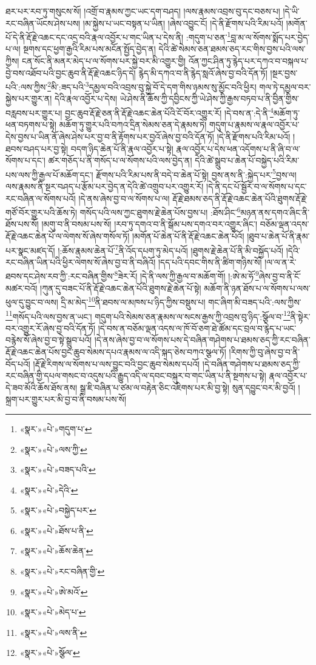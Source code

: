 ཐར་པར་རབ་ཏུ་གསུངས་སོ། །འགྲོ་བ་རྣམས་ཀྱང་ཡང་དག་བཤད། །ལས་རྣམས་འབྲས་བུ་དང་བཅས་པ། །དེ་ཡི་རང་བཞིན་ཡོངས་ཤེས་པས། །མ་སྐྱེས་པ་ཡང་བསྟན་པ་ཡིན། །ཞེས་འབྱུང་ངོ། །དེ་ནི་རྫོགས་པའི་རིམ་པའོ། །མགོན་པོ་དེ་ནི་རྡོ་རྗེ་འཆང་དང་འདྲ་བའི་རྣལ་འབྱོར་པ་གང་ཡིན་པ་དེས་ནི། :གདུག་པ་ཅན་\footnote{«སྣར་»«པེ་»གདུག་པ་}བླ་མ་ལ་སོགས་སྨོད་པར་བྱེད་པ་ལ། སྔགས་དང་ཕྱག་རྒྱའི་རིམ་པས་མངོན་སྤྱོད་བྱེད་ན། དེའི་ཚེ་སེམས་ཅན་ཐམས་ཅད་རང་གིས་བྱས་པའི་ལས་ཀྱིས། ངན་སོང་ནི་མནར་མེད་པ་ལ་སོགས་པར་སྐྱེ་བར་མི་འགྱུར་གྱི། འོན་ཀྱང་ཤིན་ཏུ་རྙེད་པར་དཀའ་བ་བསྐལ་པ་བྱེ་བས་འཐོབ་པའི་བྱང་ཆུབ་ནི་རྡོ་རྗེ་འཆང་ཉིད་དེ། རྙེད་མི་དཀའ་བ་ནི་རྙེད་སླའོ་ཞེས་བྱ་བའི་དོན་ཏོ། །སྔར་བྱས་པའི་:ལས་ཀྱིས་\footnote{«སྣར་»«པེ་»ལས་ཀྱི་}མི་:ཟད་པའི་\footnote{«སྣར་»«པེ་»བཟད་པའི་}དམྱལ་བའི་འབྲས་བུ་སྐྱེ་བོ་དེ་དག་གིས་ཉམས་སུ་མྱོང་བའི་ཕྱིར། གལ་ཏེ་དམྱལ་བར་སྐྱེས་པར་གྱུར་ན། དེའི་རྣལ་འབྱོར་པ་དེས། ཡེ་ཤེས་ནི་ཆོས་ཀྱི་དབྱིངས་ཀྱི་ཡེ་ཤེས་ཀྱི་རྒྱས་བཏབ་པ་ནི་བྱིན་གྱིས་བརླབས་པར་གྱུར་པ། བྱང་ཆུབ་རྡོ་རྗེ་ཅན་ནི་རྡོ་རྗེ་འཆང་ཆེན་པོའི་ངོ་བོར་འགྱུར་རོ། །དེ་བས་ན་:དེ་ནི་\footnote{«སྣར་»«པེ་»དེའི་}མཆོག་ཏུ་ཕན་བཏགས་པ་སྟེ། མཆོག་ཏུ་གྱུར་པའི་བཀའ་དྲིན་སེམས་ཅན་དེ་རྣམས་ཏེ། གདུག་པ་རྣམས་ལ་རྣལ་འབྱོར་པ་དེས་བྱས་པ་ཡིན་ནོ་ཞེས་ཤེས་པར་བྱ་བ་ནི་རྟོགས་པར་བྱའོ་ཞེས་བྱ་བའི་དོན་ཏོ། །དེ་ནི་རྫོགས་པའི་རིམ་པའོ། །ཐབས་བཤད་པར་བྱ་སྟེ། བདག་ཉིད་ཆེན་པོ་ནི་རྣལ་འབྱོར་པ་སྟེ། རྣལ་འབྱོར་པ་དེས་ཕན་འདོགས་པ་ནི་ཞི་བ་ལ་སོགས་པ་དང་། ཚར་གཅོད་པ་ནི་གསོད་པ་ལ་སོགས་པའི་ལས་བྱེད་ན། དེའི་ཚེ་སྒྲུབ་པ་ཆེན་པོ་བསྐྱེད་པའི་རིམ་པས་ལས་ཀྱི་རྒྱལ་པོ་མཆོག་དང་། རྫོགས་པའི་རིམ་པས་ནི་བདེ་བ་ཆེན་པོ་སྟེ། བྱས་ནས་ནི་:སྐྱེད་པར་\footnote{«སྣར་»«པེ་»བསྐྱེད་པར་}བྱས་ལ། ལས་རྣམས་ནི་སྔར་བཤད་པ་རྩོམ་པར་བྱེད་ན་དེའི་ཚེ་འགྲུབ་པར་འགྱུར་རོ། །དེ་ནི་དང་པོ་སྦྱོར་བ་ལ་སོགས་པ་དང་རང་བཞིན་ལ་སོགས་པའོ། །དེ་ནས་ཞེས་བྱ་བ་ལ་སོགས་པ་ལ། རྡོ་རྗེ་ཐམས་ཅད་ནི་རྡོ་རྗེ་འཆང་ཆེན་པོའི་ཐུགས་རྡོ་རྗེ་གཙོ་བོར་གྱུར་པའི་ཆོས་ཏེ། གསོད་པའི་ལས་ཀྱང་ཐུགས་རྗེ་ཆེན་པོས་བྱས་པ། :ཐོས་ཤིང་\footnote{«སྣར་»«པེ་»ཐོས་པ་ནི་}མཉན་ནས་དགའ་ཞིང་ནི་ཐོས་པས་སོ། །མགུ་བ་ནི་བསམ་པས་སོ། །རབ་ཏུ་དགའ་བ་ནི་སྒོམ་པས་དགའ་བར་འགྱུར་ཞིང་། བཅོམ་ལྡན་འདས་རྡོ་རྗེ་འཆང་ཆེན་པོ་ལ་ལེགས་སོ་ཞེས་གསོལ་ཏོ། །མགོན་པོ་ཆེན་པོ་ནི་རྡོ་རྗེ་འཆང་ཆེན་པོའོ། །ཐུབ་པ་ཆེན་པོ་ནི་རྣམ་པར་སྣང་མཛད་དོ། །:ཆོས་རྣམས་ཆེན་པོ་\footnote{«སྣར་»«པེ་»ཆོས་ཆེན་}ནི་འོད་དཔག་ཏུ་མེད་པའོ། །ཐུགས་རྗེ་ཆེན་པོ་ནི་མི་བསྐྱོད་པའོ། །དེའི་རང་བཞིན་ཡིན་པའི་ཕྱིར་ལེགས་སོ་ཞེས་བྱ་བ་ནི་བཞིའོ། །དད་པའི་དབང་གིས་ནི་ཚིག་གཉིས་སོ། །ལ་ལ་ན་རེ་ཐབས་དང་ཤེས་རབ་ཀྱི་:རང་བཞིན་གྱིས་\footnote{«སྣར་»«པེ་»རང་བཞིན་གྱི་}ཟེར་རོ། །དེ་ནི་ལས་ཀྱི་རྒྱལ་བ་མཆོག་གོ། །:ཨེ་མ་ཧོ་\footnote{«སྣར་»«པེ་»ཨེ་མའོ་}ཞེས་བྱ་བ་ནི་ངོ་མཚར་བའོ། །ཀུན་དུ་བཟང་པོ་ནི་རྡོ་རྗེ་འཆང་ཆེན་པོའི་ཐུགས་རྗེ་ཆེན་པོ་སྟེ། མཆོག་ནི་ཉན་ཐོས་པ་ལ་སོགས་པ་ལས་ཕུལ་དུ་བྱུང་བ་ལས། དྲི་མ་མེད་\footnote{«སྣར་»«པེ་»མེད་པ་}ནི་ཐབས་ལ་མཁས་པ་ཉིད་ཀྱིས་བསྡུས་པ། གང་ཞིག་མི་བཟད་པའི་:ལས་ཀྱིས་\footnote{«སྣར་»«པེ་»ལས་ནི་}གསོད་པའི་ལས་བྱས་ན་ཡང་། གདུག་པའི་སེམས་ཅན་རྣམས་ལ་སངས་རྒྱས་ཀྱི་འབྲས་བུ་ཉིད་:སྩོལ་བ་\footnote{«སྣར་»«པེ་»སྩོལ་}ནི་སྟེར་བར་འགྱུར་རོ་ཞེས་བྱ་བའི་དོན་ཏོ། །དེ་བས་ན་བཅོམ་ལྡན་འདས་ལ་ཁོ་བོ་ཅག་ཐེ་ཚོམ་དང་བྲལ་བ་རྙེད་པ་ཡང་བརྙེས་སོ་ཞེས་བྱ་བ་སྟེ་སྒྲུབ་པའོ། །དེ་ནས་ཞེས་བྱ་བ་ལ་སོགས་པས་དེ་བཞིན་གཤེགས་པ་ཐམས་ཅད་ཀྱི་རང་བཞིན་རྡོ་རྗེ་འཆང་ཆེན་པོས་བྱང་ཆུབ་སེམས་དཔའ་རྣམས་ལ་འདི་སྐད་ཅེས་བཀའ་སྩལ་ཏོ། །རིགས་ཀྱི་བུ་ཞེས་བྱ་བ་ནི་བོད་པའོ། །རྡོ་རྗེ་རིགས་ལ་སོགས་པ་ལས་བྱུང་བའི་བྱང་ཆུབ་སེམས་དཔའོ། །དེ་བཞིན་གཤེགས་པ་ཐམས་ཅད་ཀྱི་རང་བཞིན་གྱི་དཔལ་གསང་བ་འདུས་པའི་རྒྱུད་འདི་ལ་དབང་བསྐུར་བ་གང་ཡིན་པ་ནི་སྔགས་པ་སྟེ། རྣལ་འབྱོར་པ་དེ་ཟབ་མོའི་ཆོས་ཐོས་ནས། སྒྲ་ཇི་བཞིན་པ་ཙམ་ལ་བརྟེན་ཅིང་འཇིགས་པར་མི་བྱ་སྟེ། སུན་དབྱུང་བར་མི་བྱའོ། །སྐྲག་པར་གྱུར་པར་མི་བྱ་བ་ནི་བསམ་པས་སོ། 